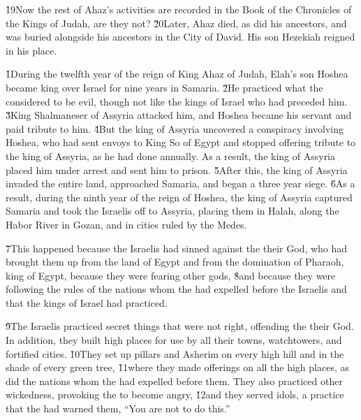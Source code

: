 \v{19}Now the rest of Ahaz's activities are recorded in the Book of the Chronicles of the Kings of Judah, are they not? \v{20}Later, Ahaz died, as did his ancestors, and was buried alongside his ancestors in the City of David. His son Hezekiah reigned in his place.

\v{1}During the twelfth year of the reign of King Ahaz of Judah, Elah's son Hoshea became king over Israel for nine years in Samaria. \v{2}He practiced what the  considered to be evil, though not like the kings of Israel who had preceded him. \v{3}King Shalmaneser of Assyria attacked him, and Hoshea became his servant and paid tribute to him. \v{4}But the king of Assyria uncovered a conspiracy involving Hoshea, who had sent envoys to King So of Egypt and stopped offering tribute to the king of Assyria, as he had done annually. As a result, the king of Assyria placed him under arrest and sent him to prison. \v{5}After this, the king of Assyria invaded the entire land, approached Samaria, and began a three year siege. \v{6}As a result, during the ninth year of the reign of Hoshea, the king of Assyria captured Samaria and took the Israelis off to Assyria, placing them in Halah, along the Habor River in Gozan, and in cities ruled by the Medes.

\v{7}This happened because the Israelis had sinned against the  their God, who had brought them up from the land of Egypt and from the domination of Pharaoh, king of Egypt, because they were fearing other gods, \v{8}and because they were following the rules of the nations whom the  had expelled before the Israelis and that the kings of Israel had practiced.

\v{9}The Israelis practiced secret things that were not right, offending the  their God. In addition, they built high places for use by all their towns, watchtowers, and fortified cities. \v{10}They set up pillars and Asherim on every high hill and in the shade of every green tree, \v{11}where they made offerings on all the high places, as did the nations whom the  had expelled before them. They also practiced other wickedness, provoking the  to become angry, \v{12}and they served idols, a practice that the  had warned them, ``You are not to do this.''

